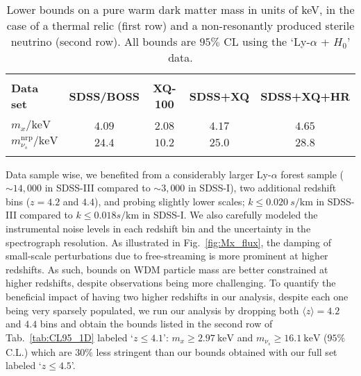 \begin{table}[!]
\begin{center}
\begin{tabular}{lcccc}
\hline \\[-10pt]
\textbf{Data set} & \textbf{SDSS/BOSS} & \textbf{XQ-100} & \textbf{SDSS+XQ} & \textbf{SDSS+XQ+HR} \\[2pt]
\hline \\[-10pt]
$m_x / \mathrm{keV}$ & $4.09$ & $2.08$ & $4.17$ & $4.65$ \\[2pt]
$m^{\mathrm{nrp}}_{\nu_s} / \mathrm{keV}$ & $24.4$ & $10.2$ & $25.0$ & $28.8$ \\[2pt]
\hline \\[-10pt]
\end{tabular}
\end{center}
\caption{Lower bounds on a pure warm dark matter mass in units of keV, in the case of a thermal relic (first row) and a non-resonantly produced sterile neutrino (second row). All bounds are $95\%$ CL using the `Ly-$\alpha$ + $H_0$' data.}
\label{tab:Mx_limits}
\end{table}


Data sample wise, we benefited from a considerably larger Ly-$\alpha$ forest sample ($\sim 14,000$ in SDSS-III compared to $\sim 3,000$ in SDSS-I), two additional redshift bins ($z=4.2$ and $4.4$), and probing slightly lower scales; $k \leqslant 0.020 ~s/\mathrm{km}$ in SDSS-III compared to  $k \leqslant 0.018 s/\mathrm{km}$ in SDSS-I. We also carefully modeled the instrumental noise levels in each redshift bin and the uncertainty in the spectrograph resolution. As illustrated in Fig.~\ref{fig:Mx_flux}, the damping of small-scale perturbations due to free-streaming is more prominent at higher redshifts. As such, bounds on WDM particle mass are better constrained at higher redshifts, despite observations being more challenging. To quantify the beneficial impact of having two higher redshifts in our analysis, despite each one being very sparsely populated, we run our analysis by dropping both $\langle z \rangle = 4.2$ and $4.4$ bins and obtain the bounds listed in the second row of Tab.~\ref{tab:CL95_1D} labeled `$z \leq 4.1$': $m_x \geqslant 2.97~\mathrm{keV}$ and $m_{\nu_s} \geqslant 16.1~\mathrm{keV}$ ($95\%$ C.L.) which are $30\%$ less stringent than our bounds obtained with our full set labeled `$z \leq 4.5$'. \\

